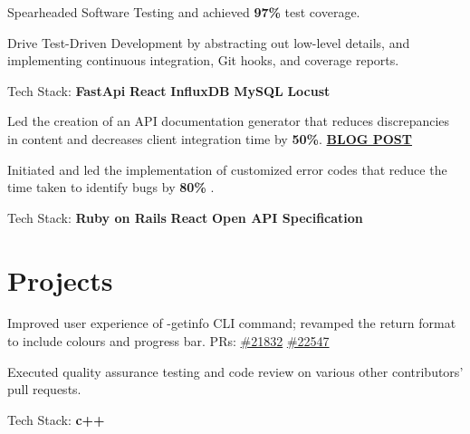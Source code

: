 \documentclass[]{Klement_Resume}
\begin{document}
\begin{minipage}[t]{0.66\textwidth}
\begin{tightemize}
\item Spearheaded Software Testing and achieved {\bf97\%} test coverage. 
\item Drive Test-Driven Development by abstracting out low-level details, and implementing continuous integration, Git hooks, and coverage reports.
\item Tech Stack: {\bf FastApi} \textbullet{} {\bf React} \textbullet{} {\bf InfluxDB} \textbullet{} {\bf MySQL} \textbullet{} {\bf Locust}
\end{tightemize}
\sectionsep


\begin{tightemize}
\item 
Led the creation of an API documentation generator that reduces discrepancies in content and decreases client integration time by {\bf50\%}. 
\href{https://medium.com/xfers-engineering/how-we-reduce-the-time-required-for-clients-to-integrate-our-apis-by-50-d14c76430e24}{\bf BLOG POST} 
\item
Initiated and led the implementation of customized error codes that reduce the time taken to identify bugs by { \bf 80\% }.
\item Tech Stack: {\bf Ruby on Rails} \textbullet{} {\bf React} \textbullet{} {\bf Open API Specification}
\end{tightemize}
\sectionsep
\section{Projects}
\begin{tightemize}
\item Improved user experience of -getinfo CLI command; revamped the return format to include colours and progress bar. PRs: \href{https://github.com/bitcoin/bitcoin/pull/21832}{\#21832} \href{https://github.com/bitcoin/bitcoin/pull/22547}{\#22547}
\item Executed quality assurance testing and code review on various other contributors' pull requests.
\item Tech Stack: {\bf c++}
\end{tightemize}
\sectionsep


\end{minipage}
\end{document}
